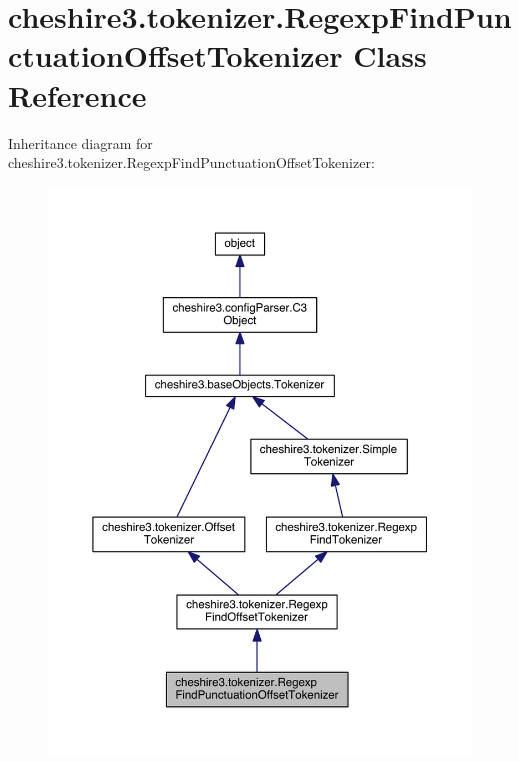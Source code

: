 \hypertarget{classcheshire3_1_1tokenizer_1_1_regexp_find_punctuation_offset_tokenizer}{\section{cheshire3.\-tokenizer.\-Regexp\-Find\-Punctuation\-Offset\-Tokenizer Class Reference}
\label{classcheshire3_1_1tokenizer_1_1_regexp_find_punctuation_offset_tokenizer}
}


Inheritance diagram for cheshire3.\-tokenizer.\-Regexp\-Find\-Punctuation\-Offset\-Tokenizer\-:
\nopagebreak
\begin{figure}[H]
\begin{center}
\leavevmode
\includegraphics[width=350pt]{classcheshire3_1_1tokenizer_1_1_regexp_find_punctuation_offset_tokenizer__inherit__graph}
\end{center}
\end{figure}


